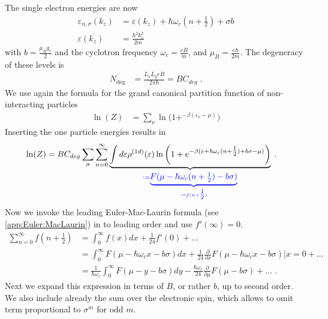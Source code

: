 The single electron energies are now
%
\begin{align*}
\varepsilon_{n,\sigma}(k_{z}) &=\varepsilon(k_{z})
+\hbar \omega_{c} (n+\tfrac{1}{2}) + \sigma b\\
\varepsilon(k_{z}) &=\frac{\hbar^{2} k_{z}^{2}}{2m}
\end{align*}
%
with $b=\frac{\mu_{B} g_{e}}{2}$ and the cyclotron frequency $\omega_{c} = \frac{e B}{m}$, and $\mu_{B} = \frac{e \hbar}{2m}$.  
The degeneracy of these levels is 
%
\begin{align*}
N_\text{deg} &= \frac{L_{x}L_{y} e B}{2 \pi \hbar} = B C_{deg}\;.
\end{align*}
%
We use again the formula for the grand canonical partition function of non-interacting particles 
%
\begin{align*}
\ln(Z)
&= \sum_{\nu} \ln\big( 1+^{-\beta(\varepsilon_{\nu}-\mu)} \big)
\end{align*}
%
Inserting the one particle energies results in
%
\begin{align}
\ln(Z)
&= B C_{deg}\sum_{\sigma} \sum_{n=0}^{\infty}\underbrace{
\int d\varepsilon\rho^{(1d)}(\varepsilon)
\ln\bigg( 1+e^{-\beta(\varepsilon + \hbar \omega_{c}(n+\tfrac{1}{2}) + b\sigma-\mu)} \bigg)
}_{\color{blue} := \underbrace{
F(\mu - \hbar \omega_{c}(n+\tfrac12) -b\sigma)
}_{\color{blue} := f(n+\tfrac12)}}\;.
\end{align}
%
Now we invoke the leading Euler-Mac-Laurin formula (see \autoref{app:Euler:MacLaurin}) in  to leading order 
and use $f'(\infty)=0$.
%
\begin{align*}
\sum_{n=0}^{\infty} f(n+\tfrac12) &= \int_{0}^{\infty} f(x) dx
+\frac{1}{24} f'(0) +\ldots\\
&=\int_{0}^{\infty} F(\mu-\hbar \omega_{c} x -b \sigma ) dx
+\frac{1}{24}\frac{\partial }{\partial x} F(\mu-\hbar \omega_{c} x -b \sigma )\bigg|x=0 +\ldots\\
&=\frac{1}{\hbar \omega_{c}}\int_{0}^{\infty} F(\mu-y -b \sigma) dy
-\frac{\hbar \omega_{c}}{24}\frac{\partial }{\partial \mu} F(\mu-b \sigma ) +\ldots\;.
\end{align*}
%
Next we expand this expression in terms of $B$, or rather $b$, up to second order. We also include already the sum over the electronic spin, which allows to omit term proportional to $\sigma^{m}$ for odd $m$.
%
